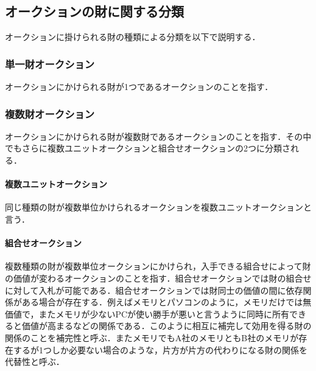 \hypertarget{ux30aaux30fcux30afux30b7ux30e7ux30f3ux306eux8ca1ux306bux95a2ux3059ux308bux5206ux985e}{%
\subsection{オークションの財に関する分類}\label{ux30aaux30fcux30afux30b7ux30e7ux30f3ux306eux8ca1ux306bux95a2ux3059ux308bux5206ux985e}}

オークションに掛けられる財の種類による分類を以下で説明する．

\hypertarget{ux5358ux4e00ux8ca1ux30aaux30fcux30afux30b7ux30e7ux30f3}{%
\subsubsection{単一財オークション}\label{ux5358ux4e00ux8ca1ux30aaux30fcux30afux30b7ux30e7ux30f3}}

オークションにかけられる財が1つであるオークションのことを指す．

\hypertarget{ux8907ux6570ux8ca1ux30aaux30fcux30afux30b7ux30e7ux30f3}{%
\subsubsection{複数財オークション}\label{ux8907ux6570ux8ca1ux30aaux30fcux30afux30b7ux30e7ux30f3}}

オークションにかけられる財が複数財であるオークションのことを指す．その中でもさらに複数ユニットオークションと組合せオークションの2つに分類される．

\hypertarget{ux8907ux6570ux30e6ux30cbux30c3ux30c8ux30aaux30fcux30afux30b7ux30e7ux30f3}{%
\paragraph{複数ユニットオークション}\label{ux8907ux6570ux30e6ux30cbux30c3ux30c8ux30aaux30fcux30afux30b7ux30e7ux30f3}}

同じ種類の財が複数単位かけられるオークションを複数ユニットオークションと言う．

\hypertarget{ux7d44ux5408ux305bux30aaux30fcux30afux30b7ux30e7ux30f3}{%
\paragraph{組合せオークション}\label{ux7d44ux5408ux305bux30aaux30fcux30afux30b7ux30e7ux30f3}}

複数種類の財が複数単位オークションにかけられ，入手できる組合せによって財の価値が変わるオークションのことを指す．組合せオークションでは財の組合せに対して入札が可能である．組合せオークションでは財同士の価値の間に依存関係がある場合が存在する．例えばメモリとパソコンのように，メモリだけでは無価値で，またメモリが少ないPCが使い勝手が悪いと言うように同時に所有できると価値が高まるなどの関係である．このように相互に補完して効用を得る財の関係のことを補完性と呼ぶ．またメモリでもA社のメモリともB社のメモリが存在するが1つしか必要ない場合のような，片方が片方の代わりになる財の関係を代替性と呼ぶ．


